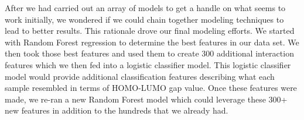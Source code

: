 \documentclass[11pt, oneside]{article}   	%
\begin{document}
After we had carried out an array of models to get a handle on what seems to work initially, we wondered if we could chain together modeling techniques to lead to better results. This rationale drove our final modeling efforts. We started with Random Forest regression to determine the best features in our data set. We then took those best features and used them to create 300 additional interaction features which we then fed into a logistic classifier model. This logistic classifier model would provide additional classification features describing what each sample resembled in terms of HOMO-LUMO gap value. Once these features were made, we re-ran a new Random Forest model which could leverage these 300+ new features in addition to the hundreds that we already had.


 
 
\end{document}

